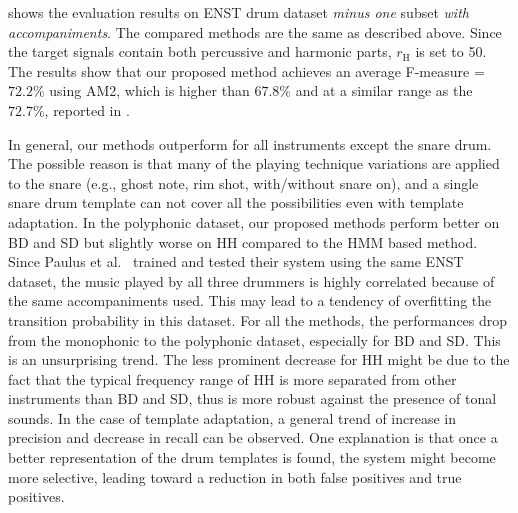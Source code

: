 \documentclass{article}
\begin{document}
 shows the evaluation results on ENST drum dataset \textit{minus one} subset \textit{with accompaniments}. The compared methods are the same as described above. Since the target signals contain both percussive and harmonic parts, $r_\mathrm{H}$ is set to 50. The results show that our proposed method achieves an average F-measure = $72.2\%$ using AM2, which is higher than $67.8\%$ \cite{gillet_transcription_2008} and at a similar range as the $72.7\%$, reported in \cite{Paulus2009a}. %

In general, our methods outperform \cite{gillet_transcription_2008} for all instruments except the snare drum. The possible reason is that many of the playing technique variations are applied to the snare (e.g., ghost note, rim shot, with/without snare on), and a single snare drum template can not cover all the possibilities even with template adaptation. In the polyphonic dataset, our proposed methods perform better on BD and SD but slightly worse on HH compared to the HMM based method\cite{Paulus2009a}. Since Paulus et al.\ \cite{Paulus2009a} trained and tested their system using the same ENST dataset, the music played by all three drummers is highly correlated because of the same accompaniments used. This may lead to a tendency of overfitting the transition probability in this dataset.
For all the methods, the performances drop from the monophonic to the polyphonic dataset, especially for BD and SD. This is an unsurprising trend. The less prominent decrease for HH might be due to the fact that the typical frequency range of HH is more separated from other instruments than BD and SD, thus is more robust against the presence of tonal sounds. In the case of template adaptation, a general trend of increase in precision and decrease in recall can be observed. One explanation is that once a better representation of the drum templates is found, the system might become more selective, leading toward a reduction in both false positives and true positives. 
\end{document}
